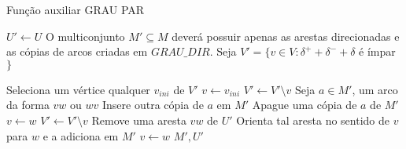     \begin{algorithm}
    \caption{Função auxiliar GRAU PAR}
    \label{mixed-grau-par}
    \begin{algorithmic}[1]
            \State $U' \gets U$
            \State O multiconjunto $M' \subseteq M$ deverá possuir apenas as arestas direcionadas e as cópias de arcos criadas em $GRAU\_DIR$.
            \State Seja $V' = \{v \in V : \delta^+ + \delta^- + \delta$ é ímpar $\}$

                \State Seleciona um vértice qualquer $v_{ini}$ de $V'$ 
                \State $v \gets v_{ini}$
                    \State $V' \gets V' \setminus v$
                    \Repeat 
                        \State Seja $a \in M'$, um arco da forma $vw$ ou $wv$
                            \State Insere outra cópia de $a$ em $M'$ \label{alg:duplica}
                        \Else
                            \State Apague uma cópia de $a$ de $M'$ \label{alg:deleta}
                        \EndIf
                        \State $v \gets w$
                    \State $V' \gets V' \setminus v$
                    \Repeat
                        \State Remove uma aresta $vw$ de $U'$
                        \State Orienta tal aresta no sentido de $v$ para $w$ e a adiciona em $M'$ \label{alg:orienta}
                        \State $v \gets w$
                \EndWhile
            \EndWhile
            \Return $M', U'$
        \EndFunction
    \end{algorithmic}
    \end{algorithm}

